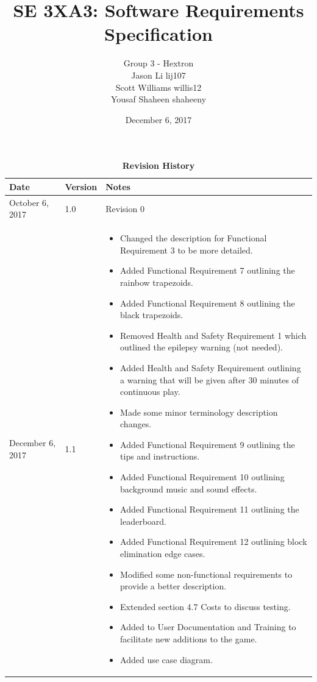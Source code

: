 \documentclass[12pt, titlepage]{article}
\title{SE 3XA3: Software Requirements Specification}
\author{Group 3 - Hextron
		\\ Jason Li lij107
		\\ Scott Williams willis12
		\\ Yousaf Shaheen shaheeny
}
\date{December 6, 2017}
\begin{document}
\maketitle

\tableofcontents
\listoftables
\listoffigures


\begin{table}[]
\caption{\bf Revision History}
\begin{tabularx}{\textwidth}{p{3cm}p{2cm}X}
\toprule {\bf Date} & {\bf Version} & {\bf Notes}\\ 
\midrule
October 6, 2017 & 1.0 & Revision 0 \\ \hline
December 6, 2017 & 1.1 & \begin{itemize}[leftmargin=0cm,itemindent=.5cm,labelwidth=\itemindent,labelsep=0cm,align=left,itemsep = 0mm,nosep]

  \item Changed the description for Functional Requirement 3 to be more detailed.
  \item Added Functional Requirement 7 outlining the rainbow trapezoids.
  \item Added Functional Requirement 8 outlining the black trapezoids.
  \item Removed Health and Safety Requirement 1 which outlined the epilepsy warning (not needed).
  \item Added Health and Safety Requirement outlining a warning that will be given after 30 minutes of continuous play.
  \item Made some minor terminology description changes.
  \item Added Functional Requirement 9 outlining the tips and instructions. 
  \item Added Functional Requirement 10 outlining background music and sound effects.
  \item Added Functional Requirement 11 outlining the leaderboard.
  \item Added Functional Requirement 12 outlining block  elimination edge cases.
  \item Modified some non-functional requirements to provide a better description.
  \item Extended section 4.7 Costs to discuss testing.
  \item Added to User Documentation and Training to facilitate new additions to the game.
  \item Added use case diagram.

  
  
  
\end{itemize} \\
\bottomrule
\end{tabularx}
\end{table}
\end{document}

